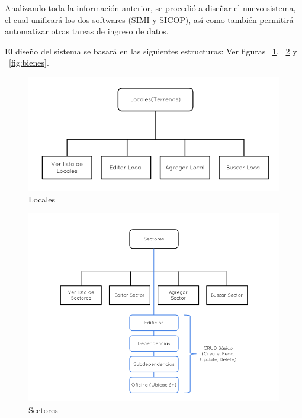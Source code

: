 Analizando toda la información anterior, se procedió a diseñar el nuevo sistema, el cual unificará los dos softwares (SIMI y SICOP), así como también permitirá automatizar otras tareas de ingreso de datos.

El diseño del sistema se basará en las siguientes estructuras: Ver figuras ~\ref{fig:locales}, ~\ref{fig:sectores} y ~\ref{fig:bienes}.

\begin{figure}[h!]
  \centering
  \includegraphics[scale=0.6]{images/activities/camila/locales.png}
  \caption{Locales}
  \label{fig:locales}
\end{figure}

\begin{figure}[h!]
  \centering
  \includegraphics[scale=0.5]{images/activities/camila/sectores.png}
  \caption{Sectores}
  \label{fig:sectores}
\end{figure}

